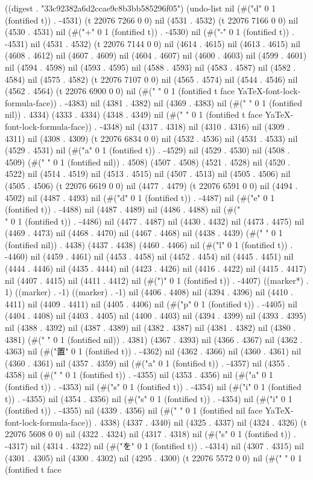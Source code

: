 
((digest . "33c92382a6d2ccae9c8b3bb585296f05") (undo-list nil (#("d" 0 1 (fontified t)) . -4531) (t 22076 7266 0 0) nil (4531 . 4532) (t 22076 7166 0 0) nil (4530 . 4531) nil (#("+" 0 1 (fontified t)) . -4530) nil (#("-" 0 1 (fontified t)) . -4531) nil (4531 . 4532) (t 22076 7144 0 0) nil (4614 . 4615) nil (4613 . 4615) nil (4608 . 4612) nil (4607 . 4609) nil (4604 . 4607) nil (4600 . 4603) nil (4599 . 4601) nil (4594 . 4598) nil (4593 . 4595) nil (4588 . 4593) nil (4583 . 4587) nil (4582 . 4584) nil (4575 . 4582) (t 22076 7107 0 0) nil (4565 . 4574) nil (4544 . 4546) nil (4562 . 4564) (t 22076 6900 0 0) nil (#(" " 0 1 (fontified t face YaTeX-font-lock-formula-face)) . -4383) nil (4381 . 4382) nil (4369 . 4383) nil (#(" " 0 1 (fontified nil)) . 4334) (4333 . 4334) (4348 . 4349) nil (#("
" 0 1 (fontified t face YaTeX-font-lock-formula-face)) . -4348) nil (4317 . 4318) nil (4310 . 4316) nil (4309 . 4311) nil (4308 . 4309) (t 22076 6834 0 0) nil (4532 . 4536) nil (4531 . 4533) nil (4529 . 4531) nil (#("a" 0 1 (fontified t)) . -4529) nil (4529 . 4530) nil (4508 . 4509) (#(" " 0 1 (fontified nil)) . 4508) (4507 . 4508) (4521 . 4528) nil (4520 . 4522) nil (4514 . 4519) nil (4513 . 4515) nil (4507 . 4513) nil (4505 . 4506) nil (4505 . 4506) (t 22076 6619 0 0) nil (4477 . 4479) (t 22076 6591 0 0) nil (4494 . 4502) nil (4487 . 4493) nil (#("d" 0 1 (fontified t)) . -4487) nil (#("e" 0 1 (fontified t)) . -4488) nil (4487 . 4489) nil (4486 . 4488) nil (#("\\" 0 1 (fontified t)) . -4486) nil (4477 . 4487) nil (4430 . 4432) nil (4473 . 4475) nil (4469 . 4473) nil (4468 . 4470) nil (4467 . 4468) nil (4438 . 4439) (#(" " 0 1 (fontified nil)) . 4438) (4437 . 4438) (4460 . 4466) nil (#("l" 0 1 (fontified t)) . -4460) nil (4459 . 4461) nil (4453 . 4458) nil (4452 . 4454) nil (4445 . 4451) nil (4444 . 4446) nil (4435 . 4444) nil (4423 . 4426) nil (4416 . 4422) nil (4415 . 4417) nil (4407 . 4415) nil (4411 . 4412) nil (#(")" 0 1 (fontified t)) . -4407) ((marker*) . 1) ((marker) . -1) ((marker) . -1) nil (4406 . 4408) nil (4394 . 4396) nil (4410 . 4411) nil (4409 . 4411) nil (4405 . 4406) nil (#("p" 0 1 (fontified t)) . -4405) nil (4404 . 4408) nil (4403 . 4405) nil (4400 . 4403) nil (4394 . 4399) nil (4393 . 4395) nil (4388 . 4392) nil (4387 . 4389) nil (4382 . 4387) nil (4381 . 4382) nil (4380 . 4381) (#(" " 0 1 (fontified nil)) . 4381) (4367 . 4393) nil (4366 . 4367) nil (4362 . 4363) nil (#("置" 0 1 (fontified t)) . -4362) nil (4362 . 4366) nil (4360 . 4361) nil (4360 . 4361) nil (4357 . 4359) nil (#("a" 0 1 (fontified t)) . -4357) nil (4355 . 4358) nil (#(" " 0 1 (fontified t)) . -4355) nil (4353 . 4356) nil (#("a" 0 1 (fontified t)) . -4353) nil (#("s" 0 1 (fontified t)) . -4354) nil (#("i" 0 1 (fontified t)) . -4355) nil (4354 . 4356) nil (#("s" 0 1 (fontified t)) . -4354) nil (#("i" 0 1 (fontified t)) . -4355) nil (4339 . 4356) nil (#(" " 0 1 (fontified nil face YaTeX-font-lock-formula-face)) . 4338) (4337 . 4340) nil (4325 . 4337) nil (4324 . 4326) (t 22076 5608 0 0) nil (4322 . 4324) nil (4317 . 4318) nil (#("s" 0 1 (fontified t)) . -4317) nil (4314 . 4322) nil (#("を" 0 1 (fontified t)) . -4314) nil (4307 . 4315) nil (4301 . 4305) nil (4300 . 4302) nil (4295 . 4300) (t 22076 5572 0 0) nil (#(" " 0 1 (fontified t face 